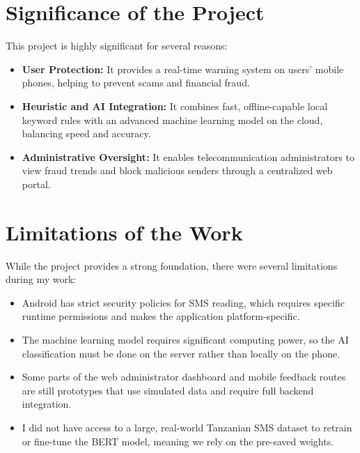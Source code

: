 \section{Significance of the Project}
This project is highly significant for several reasons:
\begin{itemize}
  \item \textbf{User Protection:} It provides a real-time warning system on users' mobile phones, helping to prevent scams and financial fraud.
  \item \textbf{Heuristic and AI Integration:} It combines fast, offline-capable local keyword rules with an advanced machine learning model on the cloud, balancing speed and accuracy.
  \item \textbf{Administrative Oversight:} It enables telecommunication administrators to view fraud trends and block malicious senders through a centralized web portal.
\end{itemize}

\section{Limitations of the Work}
While the project provides a strong foundation, there were several limitations during my work:
\begin{itemize}
  \item Android has strict security policies for SMS reading, which requires specific runtime permissions and makes the application platform-specific.
  \item The machine learning model requires significant computing power, so the AI classification must be done on the server rather than locally on the phone.
  \item Some parts of the web administrator dashboard and mobile feedback routes are still prototypes that use simulated data and require full backend integration.
  \item I did not have access to a large, real-world Tanzanian SMS dataset to retrain or fine-tune the BERT model, meaning we rely on the pre-saved weights.
\end{itemize}

